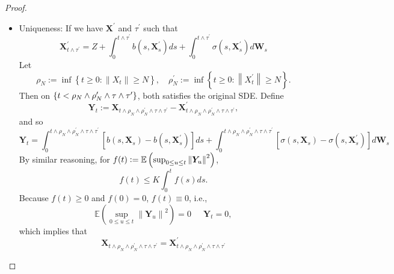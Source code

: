 \begin{proof}
\begin{itemize}
        \item Uniqueness: If we have $\bm{X}^\prime$ and $\tau^\prime$ such that
        \begin{equation*}
            \bm{X}_{t \wedge \tau^{\prime}}^{\prime}=Z+\int_0^{t \wedge \tau^{\prime}} b\left(s, \bm{X}_s^{\prime}\right) d s+\int_0^{t \wedge \tau^{\prime}} \sigma\left(s, \bm{X}_s^{\prime}\right) d \bm{W}_s
        \end{equation*}
        Let
        \begin{equation*}
            \rho_N:=\inf \left\{t \geq 0:\left\|X_t\right\| \geq N\right\}, \quad \rho_N^{\prime}:=\inf \left\{t \geq 0:\left\|X_t^{\prime}\right\| \geq N\right\}.
        \end{equation*}
        Then on $\left\{t < \rho_N \wedge \rho_N^{\prime} \wedge \tau \wedge \tau^{\prime}\right\}$, both satisfies the original SDE. Define
        \begin{equation*}
            \bm{Y}_t:=\bm{X}_{t \wedge \rho_N \wedge \rho_N^{\prime} \wedge \tau \wedge \tau^{\prime}}-\bm{X}_{t \wedge \rho_N \wedge \rho_N^{\prime} \wedge \tau \wedge \tau^{\prime}}^{\prime},
        \end{equation*}
        and so 
        \begin{equation*}
            \bm{Y}_t=\int_0^{t \wedge \rho_N \wedge \rho_N^{\prime} \wedge \tau \wedge \tau^{\prime}}\left[b\left(s, \bm{X}_s\right)-b\left(s, \bm{X}_s^{\prime}\right)\right] d s+\int_0^{t \wedge \rho_N \wedge \rho_N^{\prime} \wedge \tau \wedge \tau^{\prime}}\left[\sigma\left(s, \bm{X}_s\right)-\sigma\left(s, \bm{X}_s^{\prime}\right)\right] d \bm{W}_s
        \end{equation*}
        By similar reasoning, for $f(t) \vcentcolon= \mathbb{E}\left(\sup _{0 \leq u \leq t}\left\|\bm{Y}_u\right\|^2\right)$,
        \begin{equation*}
            f(t) \leq K \int_0^tf(s)ds.
        \end{equation*}
        Because $f(t) \geq 0$ and $f(0) = 0$, $f(t) \equiv 0$, i.e.,
        \begin{equation*}
            \mathbb{E}\left(\sup _{0 \leq u \leq t}\left\|\bm{Y}_u\right\|^2\right) = 0~\quad~ \bm{Y}_t = 0,
        \end{equation*}
        which implies that
        \begin{equation*}
            \bm{X}_{t \wedge \rho_N \wedge \rho_N^{\prime} \wedge \tau \wedge \tau^{\prime}}=\bm{X}_{t \wedge \rho_N \wedge \rho_N^{\prime} \wedge \tau \wedge \tau^{\prime}}^{\prime}
        \end{equation*}

\end{itemize}
\end{proof}
